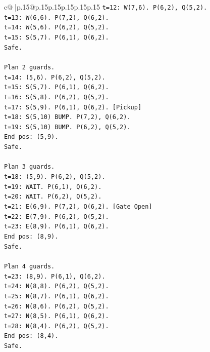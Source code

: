 \documentclass{article}
\begin{document}
{\begin{supertabular}{c@{$\;$}|p{.15\linewidth}@{}p{.15\linewidth}p{.15\linewidth}p{.15\linewidth}p{.15\linewidth}p{.15\linewidth}}
{{{\texttt{t=12: W(7,6). P(6,2), Q(5,2).} \\
\texttt{t=13: W(6,6). P(7,2), Q(6,2).} \\
\texttt{t=14: W(5,6). P(6,2), Q(5,2).} \\
\texttt{t=15: S(5,7). P(6,1), Q(6,2).} \\
\texttt{Safe.} \\
\\ 
\texttt{Plan 2 guards.} \\
\texttt{t=14: (5,6). P(6,2), Q(5,2).} \\
\texttt{t=15: S(5,7). P(6,1), Q(6,2).} \\
\texttt{t=16: S(5,8). P(6,2), Q(5,2).} \\
\texttt{t=17: S(5,9). P(6,1), Q(6,2). {[}Pickup{]}} \\
\texttt{t=18: S(5,10) BUMP. P(7,2), Q(6,2).} \\
\texttt{t=19: S(5,10) BUMP. P(6,2), Q(5,2).} \\
\texttt{End pos: (5,9).} \\
\texttt{Safe.} \\
\\ 
\texttt{Plan 3 guards.} \\
\texttt{t=18: (5,9). P(6,2), Q(5,2).} \\
\texttt{t=19: WAIT. P(6,1), Q(6,2).} \\
\texttt{t=20: WAIT. P(6,2), Q(5,2).} \\
\texttt{t=21: E(6,9). P(7,2), Q(6,2). {[}Gate Open{]}} \\
\texttt{t=22: E(7,9). P(6,2), Q(5,2).} \\
\texttt{t=23: E(8,9). P(6,1), Q(6,2).} \\
\texttt{End pos: (8,9).} \\
\texttt{Safe.} \\
\\ 
\texttt{Plan 4 guards.} \\
\texttt{t=23: (8,9). P(6,1), Q(6,2).} \\
\texttt{t=24: N(8,8). P(6,2), Q(5,2).} \\
\texttt{t=25: N(8,7). P(6,1), Q(6,2).} \\
\texttt{t=26: N(8,6). P(6,2), Q(5,2).} \\
\texttt{t=27: N(8,5). P(6,1), Q(6,2).} \\
\texttt{t=28: N(8,4). P(6,2), Q(5,2).} \\
\texttt{End pos: (8,4).} \\
\texttt{Safe.} \\
}}}
\end{supertabular}}
\end{document}
